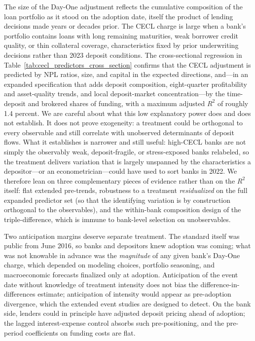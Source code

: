 The size of the Day-One adjustment reflects the cumulative composition of the
loan portfolio as it stood on the adoption date, itself the product of
lending decisions made years or decades prior.  The CECL charge is large when
a bank's portfolio contains loans with long remaining maturities, weak
borrower credit quality, or thin collateral coverage, characteristics fixed
by prior underwriting decisions rather than 2023 deposit conditions.  The
cross-sectional regression in Table~\ref{tab:cecl_predictors_cross_section}
confirms that the CECL adjustment is predicted by NPL ratios, size, and
capital in the expected directions, and---in an expanded specification that
adds deposit composition, eight-quarter profitability and asset-quality
trends, and local deposit-market concentration---by the time-deposit and
brokered shares of funding, with a maximum adjusted $R^2$ of roughly 1.4
percent.  We are careful about what this low explanatory power does and does
not establish.  It does not prove exogeneity: a treatment could be orthogonal
to every observable and still correlate with unobserved determinants of
deposit flows.  What it establishes is narrower and still useful: high-CECL
banks are not simply the observably weak, deposit-fragile, or stress-exposed
banks relabeled, so the treatment delivers variation that is largely
unspanned by the characteristics a depositor---or an econometrician---could
have used to sort banks in 2022.  We therefore lean on three complementary
pieces of evidence rather than on the $R^2$ itself: flat extended
pre-trends, robustness to a treatment \emph{residualized} on the full
expanded predictor set (so that the identifying variation is by construction
orthogonal to the observables), and the within-bank composition design of the
triple-difference, which is immune to bank-level selection on unobservables.

Two anticipation margins deserve separate treatment.  The standard itself was
public from June 2016, so banks and depositors knew adoption was coming;
what was not knowable in advance was the \emph{magnitude} of any given bank's
Day-One charge, which depended on modeling choices, portfolio seasoning, and
macroeconomic forecasts finalized only at adoption.  Anticipation of the
event date without knowledge of treatment intensity does not bias the
difference-in-differences estimate; anticipation of intensity would appear as
pre-adoption divergence, which the extended event studies are designed to
detect.  On the bank side, lenders could in principle have adjusted deposit
pricing ahead of adoption; the lagged interest-expense control absorbs such
pre-positioning, and the pre-period coefficients on funding costs are flat.


